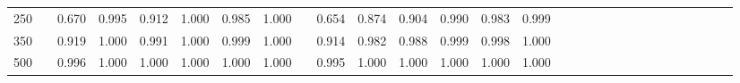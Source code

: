 % 
\begin{tabular}{ccccccccccccccccccccccccccccc}
  \hline
  \hline
250 &  & 0.670 & 0.995 & 0.912 & 1.000 & 0.985 & 1.000 &  & 0.654 & 0.874 & 0.904 & 0.990 & 0.983 & 0.999 &  &  &  &  &  &  &  &  &  &  &  &  &  &  \\ 
  350 &  & 0.919 & 1.000 & 0.991 & 1.000 & 0.999 & 1.000 &  & 0.914 & 0.982 & 0.988 & 0.999 & 0.998 & 1.000 &  &  &  &  &  &  &  &  &  &  &  &  &  &  \\ 
  500 &  & 0.996 & 1.000 & 1.000 & 1.000 & 1.000 & 1.000 &  & 0.995 & 1.000 & 1.000 & 1.000 & 1.000 & 1.000 &  &  &  &  &  &  &  &  &  &  &  &  &  &  \\ 
   \hline
\end{tabular}
